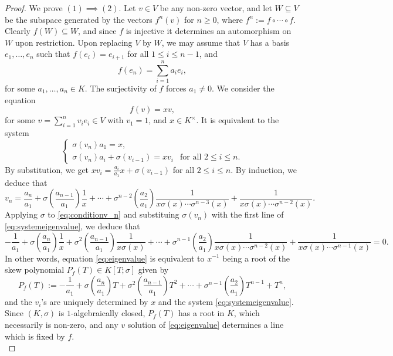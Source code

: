 \documentclass[12pt]{amsart}
\theoremstyle{definition}
\newcommand{\<}{\langle}   %
\renewcommand{\>}{\rangle} %
\begin{document}
\begin{proof}
    We prove $(1) \implies (2)$. Let $v \in V$ be any non-zero vector, and let $W \subseteq V$ be the subspace generated by the vectors $f^n(v)$ for $n \geq 0$, where $f^n := f \circ \cdots \circ f$. Clearly $f(W) \subseteq W$, and since $f$ is injective it determines an automorphism on $W$ upon restriction. Upon replacing $V$ by $W$, we may assume that $V$ has a basis $e_1,\ldots , e_n$ such that $f(e_i) = e_{i+1}$ for all $1 \leq i \leq n-1$, and 
    \begin{equation*}
        f(e_n) = \sum_{i=1}^n a_ie_i,
    \end{equation*}
    for some $a_1, \ldots , a_n \in K$. The surjectivity of $f$ forces $a_1 \not = 0$. We consider the equation 
    \begin{equation} \label{eq:eigenvalue}
        f(v) = xv,
    \end{equation}
    for some $v = \sum_{i=1}^n v_ie_i \in V$ with $v_1 = 1$, and $x \in K^{\times}$. It is equivalent to the system 
    \begin{equation} \label{eq:systemeigenvalue}
        \begin{cases}
            \sigma(v_n)a_1 = x, & \\
            \sigma(v_n)a_i + \sigma(v_{i-1}) = xv_i & \text{for all } 2 \leq i \leq n.
        \end{cases}
    \end{equation}
    By substitution, we get $xv_i = \frac{a_i}{a_1}x + \sigma(v_{i-1})$ for all $2 \leq i \leq n$. By induction, we deduce that 
    \begin{equation} \label{eq:conditionv_n}
        v_n = \frac{a_n}{a_1} + \sigma\left(\frac{a_{n-1}}{a_1}\right)\frac{1}{x} + \cdots + \sigma^{n-2}\left(\frac{a_2}{a_1}\right)\frac{1}{x\sigma(x)\cdots \sigma^{n-3}(x)}+\frac{1}{x\sigma(x)\cdots \sigma^{n-2}(x)}.
    \end{equation}
    Applying $\sigma$ to \eqref{eq:conditionv_n} and substituing $\sigma(v_n)$ with the first line of \eqref{eq:systemeigenvalue}, we deduce that 
    \begin{equation*}
        - \frac{1}{a_1} + \sigma\left(\frac{a_n}{a_1}\right)\frac{1}{x} + \sigma^2\left(\frac{a_{n-1}}{a_1}\right)\frac{1}{x\sigma(x)} + \cdots + \sigma^{n-1}\left(\frac{a_2}{a_1}\right)\frac{1}{x\sigma(x)\cdots \sigma^{n-2}(x)}+\frac{1}{x\sigma(x)\cdots \sigma^{n-1}(x)} = 0.
    \end{equation*}
    In other words, equation \eqref{eq:eigenvalue} is equivalent to $x^{-1}$ being a root of the skew polynomial $P_f(T) \in K[T;\sigma]$ given by 
    \begin{equation*}
        P_f(T) := -\frac{1}{a_1} + \sigma\left(\frac{a_n}{a_1}\right)T + \sigma^2\left(\frac{a_{n-1}}{a_1}\right)T^2 + \cdots + \sigma^{n-1}\left(\frac{a_2}{a_1}\right)T^{n-1}+T^n,
    \end{equation*}
    and the $v_i$'s are uniquely determined by $x$ and the system \eqref{eq:systemeigenvalue}. Since $(K,\sigma)$ is $1$-algebraically closed, $P_f(T)$ has a root in $K$, which necessarily is non-zero, and any $v$ solution of \eqref{eq:eigenvalue} determines a line which is fixed by $f$. \\
    

\end{proof}
\end{document}
